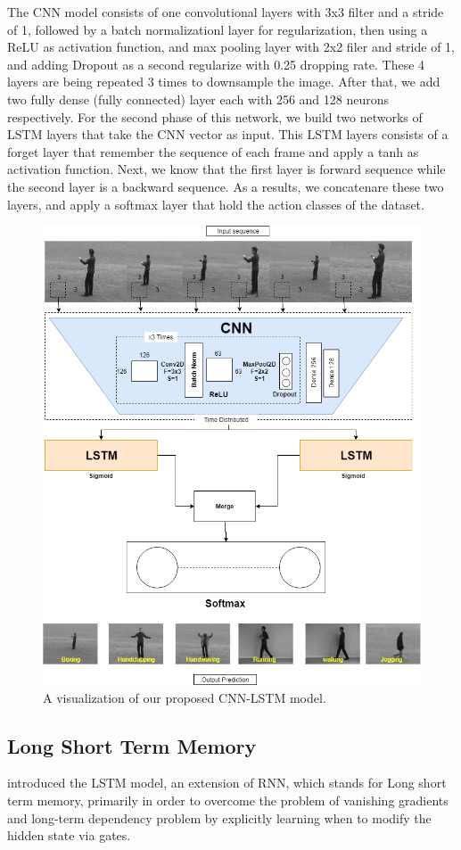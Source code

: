 The CNN model consists of one convolutional layers with 3x3 filter and a stride of 1, followed by a batch normalizationl layer for regularization, then using a ReLU as activation function, and max pooling layer with 2x2 filer and stride of 1, and adding Dropout as a second regularize with 0.25 dropping rate. These 4 layers are being repeated 3 times to downsample the image. After that, we add two fully dense (fully connected) layer each with 256 and 128 neurons respectively. For the second phase of this network, we build two networks of LSTM layers that take the CNN vector as input. This LSTM layers consists of a forget layer that remember the sequence of each frame and apply a tanh as activation function. Next, we know that the first layer is forward sequence while the second layer is a backward sequence. As a results, we concatenare these two layers, and apply a softmax layer that hold the action classes of the dataset. 
\begin{figure}[ht]
\centering
\includegraphics[width=0.75\columnwidth]{Figures/cnnlstm.png}
\decoRule
\caption[A visualization of our proposed CNN-LSTM model.]{A visualization of our proposed CNN-LSTM model.}
\label{fig:lstmcnn}
\end{figure}


\subsection{Long Short Term Memory}
\cite{hochreiter1997long} introduced the LSTM model, an extension of RNN, which stands for Long short term memory, primarily in order to overcome the problem of vanishing gradients and long-term dependency problem by explicitly learning when to modify the hidden state via gates.\\

